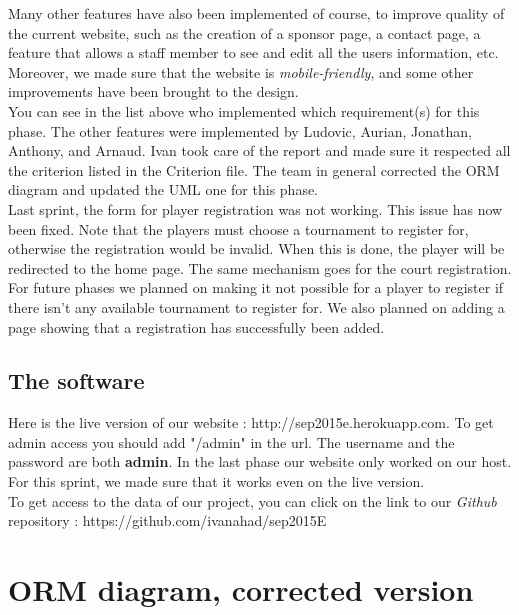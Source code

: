 \documentclass[a4paper, 12pt]{article}
\begin{document}
Many other features have also been implemented of course, to improve quality of the current website, such as the creation of a sponsor page, a contact page, a feature that allows a staff member to see and edit all the users information, etc. Moreover, we made sure that the website is \textit{mobile-friendly}, and some other improvements have been brought to the design.\\

You can see in the list above who implemented which requirement(s) for this phase. The other features were implemented by Ludovic, Aurian, Jonathan, Anthony, and Arnaud. Ivan took care of the report and made sure it respected all the criterion listed in the Criterion file. The team in general corrected the ORM diagram and updated the UML one for this phase. \\

Last sprint, the form for player registration was not working. This issue has now been fixed. Note that the players must choose a tournament to register for, otherwise the registration would be invalid. When this is done, the player will be redirected to the home page. The same mechanism goes for the court registration.  For future phases we planned on making it not possible for a player to register if there isn't any available tournament to register for. We also planned on adding a page showing that a registration has successfully been added.\\

\subsection{The software}

Here is the live version of our website : http://sep2015e.herokuapp.com.  To get admin access you should add "/admin" in the url. The username and the password are both \textbf{admin}. In the last phase our website only worked on our host. For this sprint, we made sure that it works even on the live version.\\

To get access to the data of our project, you can click on the link to our \textit{Github} repository : https://github.com/ivanahad/sep2015E\\ 

\section{ORM diagram, corrected version}
\end{document}
